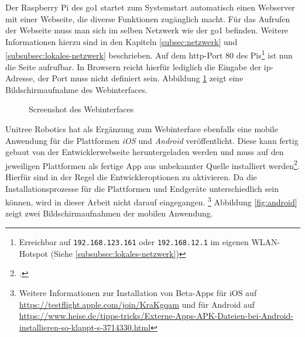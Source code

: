 
Der Raspberry Pi des \gls{go1} startet zum Systemstart automatisch einen Webserver mit einer Webseite, die diverse Funktionen
zugänglich macht.
Für das Aufrufen der Webseite muss man sich im selben Netzwerk wie der \gls{go1} befinden.
Weitere Informationen hierzu sind in den Kapiteln \ref{subsec:netzwerk} und \ref{subsubsec:lokales-netzwerk} beschrieben.
Auf dem \gls{http}-Port \num{80} des Pis\footnote{Erreichbar auf \texttt{192.168.123.161} oder \texttt{192.168.12.1} im eigenen WLAN-Hotspot (Siehe \ref{subsubsec:lokales-netzwerk})}
ist nun die Seite aufrufbar.
In Browsern reicht hierfür lediglich die Eingabe der \gls{ip}-Adresse, der Port muss nicht definiert sein.
Abbildung \ref{fig:website} zeigt eine Bildschirmaufnahme des Webinterfaces.

\begin{figure}[h]
    \caption{Screenshot des Webinterfaces}\label{fig:website}
\end{figure}


Unitree Robotics hat als Ergänzung zum Webinterface ebenfalls eine mobile Anwendung für die Plattformen \emph{iOS} und
\emph{Android} veröffentlicht.
Diese kann fertig gebaut von der Entwicklerwebseite heruntergeladen werden und muss auf den jeweiligen Plattformen als
fertige App aus unbekannter Quelle installiert werden\footcite{unitree_app_download}.
Hierfür sind in der Regel die Entwickleroptionen zu aktivieren.
Da die Installationsprozesse für die Plattformen und Endgeräte unterschiedlich sein können, wird in dieser Arbeit nicht
darauf eingegangen.
\footnote{Weitere Informationen zur Installation von Beta-Apps für iOS auf \url{https://testflight.apple.com/join/KraKgqam}
und für Android auf \url{https://www.heise.de/tipps-tricks/Externe-Apps-APK-Dateien-bei-Android-installieren-so-klappt-s-3714330.html}}
Abbildung \ref{fig:android} zeigt zwei Bildschirmaufnahmen der mobilen Anwendung.

